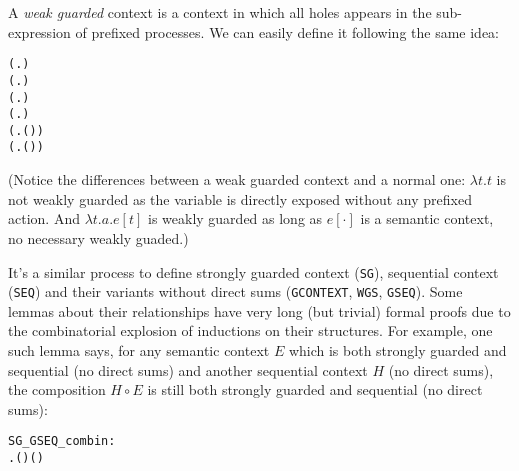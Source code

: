A \emph{weak guarded} context is a context in which all holes appears
in the sub-expression of prefixed processes. We can easily define it
following the same idea:
\begin{alltt}
 (\HOLTokenLambda{}. )
  \HOLSymConst{\HOLTokenImp{}}  (\HOLTokenLambda{}.  )
  \HOLSymConst{\HOLTokenConj{}}   \HOLSymConst{\HOLTokenImp{}}  (\HOLTokenLambda{}.   \HOLSymConst{+}  )
  \HOLSymConst{\HOLTokenConj{}}   \HOLSymConst{\HOLTokenImp{}}  (\HOLTokenLambda{}.   \HOLSymConst{\ensuremath{\parallel}}  )
  \HOLSymConst{\HOLTokenImp{}}  (\HOLTokenLambda{}. \HOLSymConst{\ensuremath{\nu}}  ( ))
  \HOLSymConst{\HOLTokenImp{}}  (\HOLTokenLambda{}.  ( ) )
\end{alltt}
(Notice the differences between a weak guarded context and a normal
one: $\lambda t. t$ is not weakly guarded as the variable is directly
exposed without any prefixed action. And $\lambda t. a.e[t]$ is weakly
guarded as long as $e[\cdot]$ is a semantic context, no necessary weakly guaded.)

It's a similar process to define strongly guarded context
(\texttt{SG}), sequential context (\texttt{SEQ}) and their
variants without direct sums (\texttt{GCONTEXT}, \texttt{WGS},
\texttt{GSEQ}). Some lemmas about their relationships have very long
(but trivial) formal proofs due to the combinatorial explosion of
inductions on their structures. For example, one such 
lemma says, for any semantic context $E$ which is both strongly guarded
and sequential (no direct sums) and another sequential context $H$ (no
direct sums), the composition $H \circ E$ is still both strongly
guarded and sequential (no direct sums):
\begin{alltt}
SG_GSEQ_combin:
\HOLTokenTurnstile{}   \HOLSymConst{\HOLTokenConj{}}   \HOLSymConst{\HOLTokenImp{}} \HOLSymConst{\HOLTokenForall{}}.   \HOLSymConst{\HOLTokenImp{}}  ( \HOLSymConst{\HOLTokenCompose} ) \HOLSymConst{\HOLTokenConj{}}  ( \HOLSymConst{\HOLTokenCompose} )
\end{alltt}

